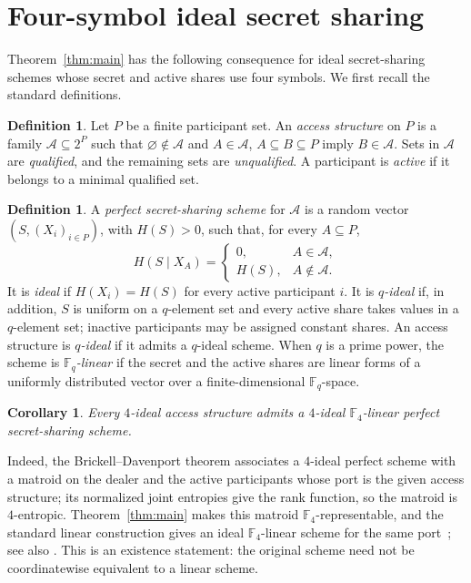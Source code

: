 \documentclass[preprint,12pt]{elsarticle}
\newtheorem{corollary}[theorem]{Corollary}
\theoremstyle{definition}
\newtheorem{definition}[theorem]{Definition}
\newcommand{\F}{\mathbb F}
\begin{document}
\section{Four-symbol ideal secret sharing}\label{sec:sss}

Theorem~\ref{thm:main} has the following consequence for ideal
secret-sharing schemes whose secret and active shares use four symbols. We
first recall the standard definitions.


\begin{definition}
Let $P$ be a finite participant set. An \emph{access structure} on $P$ is a
family $\mathcal A\subseteq 2^P$ such that $\varnothing\notin\mathcal A$ and
$A\in\mathcal A$, $A\subseteq B\subseteq P$ imply $B\in\mathcal A$. Sets in
$\mathcal A$ are \emph{qualified}, and the remaining sets are
\emph{unqualified}. A participant is \emph{active} if it belongs to a minimal
qualified set.
\end{definition}

\begin{definition}
A \emph{perfect secret-sharing scheme} for $\mathcal A$ is a random vector
$(S,(X_i)_{i\in P})$, with $H(S)>0$, such that, for every $A\subseteq P$,
\[
H(S\mid X_A)=
\begin{cases}
0,&A\in\mathcal A,\\
H(S),&A\notin\mathcal A.
\end{cases}
\]
It is \emph{ideal} if $H(X_i)=H(S)$ for every active participant $i$. It is
\emph{$q$-ideal} if, in addition, $S$ is uniform on a $q$-element set and
every active share takes values in a $q$-element set; inactive participants
may be assigned constant shares. An access structure is \emph{$q$-ideal} if
it admits a $q$-ideal scheme. When $q$ is a prime power, the scheme is
\emph{$\F_q$-linear} if the secret and the active shares are linear forms of
a uniformly distributed vector over a finite-dimensional $\F_q$-space.
\end{definition}

\begin{corollary}\label{cor:sss}
Every $4$-ideal access structure admits a $4$-ideal
$\F_4$-linear perfect secret-sharing scheme.
\end{corollary}

Indeed, the Brickell--Davenport theorem associates a $4$-ideal
perfect scheme with a matroid on the dealer and the active participants whose
port is the given access structure; its normalized joint entropies give the
rank function, so the matroid is $4$-entropic. Theorem~\ref{thm:main} makes
this matroid $\F_4$-representable, and the standard linear construction gives
an ideal $\F_4$-linear scheme for the same port~\cite{BrickellDavenport1991};
see also \cite[Section~5.3]{Matus1999}. This is an existence statement: the
original scheme need not be coordinatewise equivalent to a linear scheme.
\end{document}
